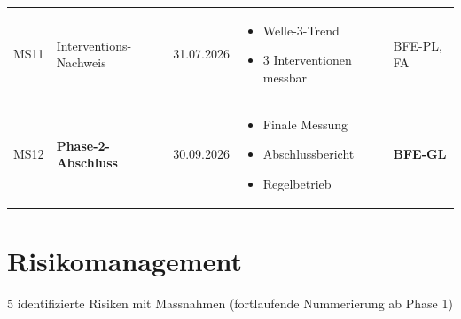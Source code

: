 \documentclass[11pt,a4paper]{article}
\begin{document}
\begin{longtable}{c l l p{5cm} l}
\rowcolor{falightgray}
MS11 & Interventions-Nachweis & 31.07.2026 &
    \begin{minipage}[t]{5cm}
    \vspace{0.1cm}
    \begin{itemize}[leftmargin=*, nosep]
        \item Welle-3-Trend
        \item 3 Interventionen messbar
    \end{itemize}
    \vspace{0.1cm}
    \end{minipage} & BFE-PL, FA\\

MS12 & \textbf{Phase-2-Abschluss} & 30.09.2026 &
    \begin{minipage}[t]{5cm}
    \vspace{0.1cm}
    \begin{itemize}[leftmargin=*, nosep]
        \item Finale Messung
        \item Abschlussbericht
        \item Regelbetrieb
    \end{itemize}
    \vspace{0.1cm}
    \end{minipage} & \textbf{BFE-GL}\\

\bottomrule
\end{longtable}

\newpage

\section{Risikomanagement}

\begin{tcolorbox}[risikobox={Risiko-Register Phase 2}]
5 identifizierte Risiken mit Massnahmen (fortlaufende Nummerierung ab Phase 1)
\end{tcolorbox}
\end{document}
